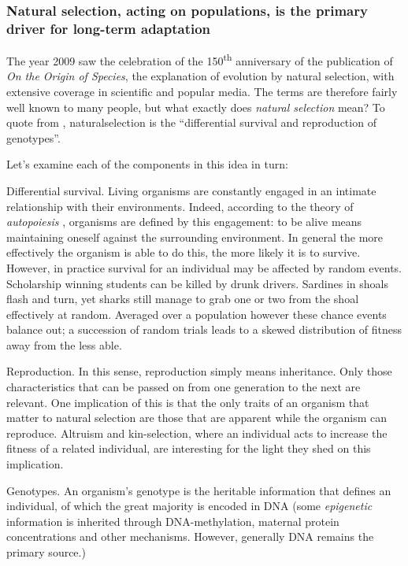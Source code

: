 \subsubsection{Natural selection, acting on populations, is the primary driver for long-term adaptation}
\label{natural-selection-acting-on-populations-is-the-primary-driver-for-long-term-adaptation}

The year 2009 saw the celebration of the 150\textsuperscript{th} anniversary of the publication of \emph{On the Origin of Species}, the explanation of evolution by natural selection, with extensive coverage in scientific and popular media. The terms are therefore fairly well known to many people, but what exactly does \emph{natural selection} mean? To quote from \autocite{Futuyama:1979tg}, \gls{naturalselection} is the ``differential survival and reproduction of genotypes''.

Let's examine each of the components in this idea in turn:

Differential survival. Living organisms are constantly engaged in an intimate relationship with their environments. Indeed, according to the theory of \emph{autopoiesis} \autocite{Varela:1974qd}, organisms are defined by this engagement: to be alive means maintaining oneself against the surrounding environment. In general the more effectively the organism is able to do this, the more likely it is to survive. However, in practice survival for an individual may be affected by random events. Scholarship winning students can be killed by drunk drivers. Sardines in shoals flash and turn, yet sharks still manage to grab one or two from the shoal effectively at random. Averaged over a population however these chance events balance out; a succession of random trials leads to a skewed distribution of fitness away from the less able.

Reproduction. In this sense, reproduction simply means inheritance. Only those characteristics that can be passed on from one generation to the next are relevant. One implication of this is that the only traits of an organism that matter to natural selection are those that are apparent while the organism can reproduce. Altruism and kin-selection, where an individual acts to increase the fitness of a related individual, are interesting for the light they shed on this implication.

Genotypes. An organism's \gls{genotype} is the heritable information that defines an individual, of which the great majority is encoded in DNA (some \emph{epigenetic} information is inherited through DNA-methylation, maternal protein concentrations and other mechanisms. However, generally DNA remains the primary source.)

